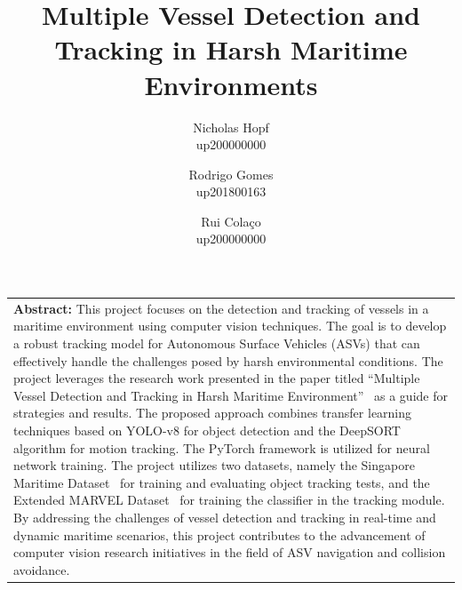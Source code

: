 \documentclass[a4paper,12pt]{article}
\title{
\textbf{Multiple Vessel Detection and Tracking in Harsh Maritime Environments}
}
\author{
    Nicholas Hopf\\
    up200000000
    \and
    Rodrigo Gomes\\
    up201800163
    \and
    Rui Colaço\\
    up200000000
}
\date{\vspace{-3ex}}
\begin{document}
\maketitle


\vspace{10pt}

\begin{table}[h]
	\centering
	\begin{tabular}{p{14cm}}
        {\textbf{Abstract:}} This project focuses on the detection and tracking of vessels in a maritime environment using computer vision techniques.
        The goal is to develop a robust tracking model for Autonomous Surface Vehicles (ASVs) that can effectively handle the challenges posed by harsh environmental conditions.
        The project leverages the research work presented in the paper titled ``Multiple Vessel Detection and Tracking in Harsh Maritime Environment''~\cite{MVDTHME} as a guide for strategies and results.
        The proposed approach combines transfer learning techniques based on YOLO-v8 for object detection and the DeepSORT algorithm for motion tracking.
        The PyTorch framework is utilized for neural network training.
        The project utilizes two datasets, namely the Singapore Maritime Dataset~\cite{SINGAPORE} for training and evaluating object tracking tests, and the Extended MARVEL Dataset~\cite{MARVEL} for training the classifier in the tracking module.
        By addressing the challenges of vessel detection and tracking in real-time and dynamic maritime scenarios, this project contributes to the advancement of computer vision research initiatives in the field of ASV navigation and collision avoidance.
	\end{tabular}\label{tab:abstract}
\end{table}
\end{document}

